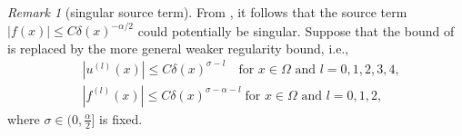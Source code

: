 \documentclass{amsart}
\theoremstyle{definition}
\theoremstyle{remark}
\newtheorem{remark}[theorem]{Remark}
\numberwithin{equation}{section}
\begin{document}
\begin{remark}[singular source term]
\label{rmk:weak-reg-u}
  From , it follows that the source term  $|f(x)| \le C \delta(x)^{-\alpha/2}$ could potentially be singular.
  Suppose that the bound of 
  is replaced by the more general weaker regularity bound, i.e.,
  \begin{equation*}
  \begin{split}
    &|u^{(l)}(x)| \le C 
    \delta(x)^{\sigma-l}  \quad \text{for  } x \in \Omega \text{  and  } l=0, 1, 2, 3, 4,    \\
    &|f^{(l)}(x)| \le C
    \delta(x)^{\sigma-\alpha-l} \; \text{for  } x \in \Omega \text{  and  } l=0, 1, 2,
  \end{split}
  \end{equation*}
  where \(\sigma \in (0, \frac{\alpha}{2}]\) is fixed. 
  

\end{remark}
\end{document}
